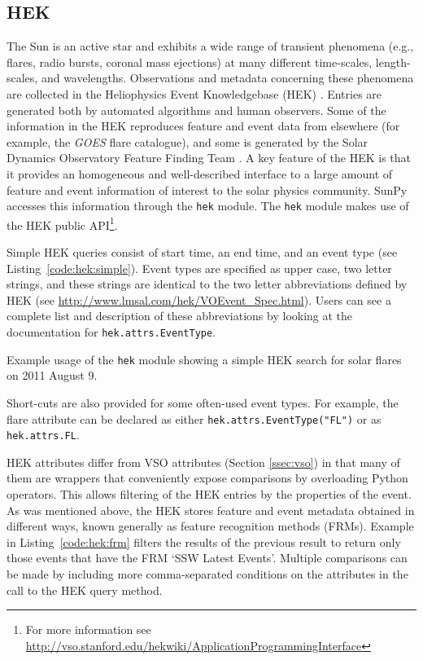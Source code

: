 \subsection{HEK}\label{ssec:hek}

The Sun is an active star and exhibits a wide range of transient phenomena 
(e.g., flares, radio bursts, coronal mass ejections) at many different time-scales, 
length-scales, and 
wavelengths. Observations and metadata concerning these phenomena are collected 
in the Heliophysics Event Knowledgebase (HEK) \citep{hek2012}.  Entries are generated both by 
automated algorithms and human observers.  Some of the information in the HEK 
reproduces feature and event data from elsewhere (for example, the \textit{GOES} flare catalogue),
and some is generated by the Solar Dynamics Observatory Feature Finding Team 
\citep{martens2012}.  A key feature of the HEK is that it
provides an homogeneous and well-described interface to a large amount of 
feature and event information of interest to the solar physics community. SunPy 
accesses this information through the \texttt{hek} module.  The \texttt{hek} module makes use of the 
HEK public API\footnote{For more information see \url{http://vso.stanford.edu/hekwiki/ApplicationProgrammingInterface}}.

Simple HEK queries consist of start time, an end time, and an event type 
(see Listing~\ref{code:hek:simple}). Event types are specified as upper case, 
two letter strings, and these strings are 
identical to the two letter abbreviations defined by HEK 
(see \url{http://www.lmsal.com/hek/VOEvent_Spec.html}). Users can see a
complete list and description of these abbreviations by looking at the documentation
for \texttt{hek.attrs.EventType}.

\begin{listing}[H]
\caption{Example usage of the \texttt{hek} module showing a simple HEK search for solar flares
on 2011 August 9.}
\label{code:hek:simple}
\end{listing}

Short-cuts are also provided for some often-used event types. For example, 
the flare attribute can be declared as either 
\texttt{hek.attrs.EventType("FL")} or as \texttt{hek.attrs.FL}. 

HEK attributes differ from VSO attributes (Section \ref{ssec:vso}) in that many 
of them are wrappers that conveniently expose comparisons by overloading Python 
operators. This allows filtering of the HEK entries by the properties of the 
event. As was mentioned above, the HEK stores feature and event metadata obtained 
in different ways, known generally as feature recognition methods (FRMs). 
Example in Listing~\ref{code:hek:frm} filters the results of the previous 
result to return only those events that have the FRM `SSW Latest Events'.  
Multiple comparisons can be made by including more comma-separated
conditions on the attributes in the call to the HEK query method.

